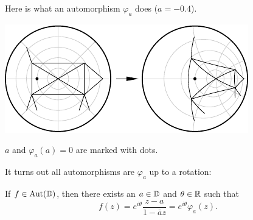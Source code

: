 \documentclass[10pt,aspectratio=169]{beamer}
\begin{document}
\begin{frame}
Here is what an automorphism $\varphi_a$ does ($a=-0.4$).

\begin{center}
\includegraphics{../figures/varphiplot}
\end{center}

$a$ and $\varphi_a(a)=0$ are marked with dots.

\pause
\medskip

It turns out all automorphisms are $\varphi_a$ up to a rotation:

\pause

\begin{proposition}
If $f \in \operatorname{Aut}({\mathbb{D}})$, then there exists an $a \in {\mathbb{D}}$
and $\theta \in {\mathbb{R}}$ such that
\begin{equation*}
f(z) = e^{i\theta} \frac{z-a}{1-\bar{a}z} = e^{i\theta} \varphi_a(z).
\end{equation*}
\end{proposition}

\end{frame}
\end{document}
